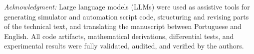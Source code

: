 \documentclass[conference]{IEEEtran}
\begin{document}
\emph{Acknowledgment:} Large language models (LLMs) were used as assistive tools for generating simulator and automation script code, structuring and revising parts of the technical text, and translating the manuscript between Portuguese and English. All code artifacts, mathematical derivations, differential tests, and experimental results were fully validated, audited, and verified by the authors.



\end{document}
